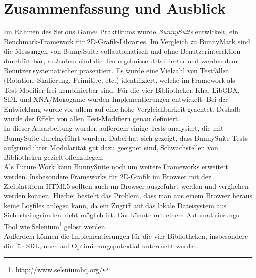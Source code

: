 \chapter{Zusammenfassung und Ausblick}
Im Rahmen des Serious Games Praktikums wurde \textit{BunnySuite} entwickelt, ein Benchmark-Framework für 2D-Grafik-Libraries. Im Vergleich zu BunnyMark sind die Messungen von BunnySuite vollautomatisch und ohne Benutzerinteraktion durchführbar, außerdem sind die Testergebnisse detaillierter und werden dem Benutzer systematischer präsentiert. Es wurde eine Vielzahl von Testfällen (Rotation, Skalierung, Primitive, etc.) identifiziert, welche im Framework als Test-Modifier frei kombinierbar sind. Für die vier Bibliotheken Kha, LibGDX, SDL und XNA/Monogame wurden Implementierungen entwickelt. Bei der Entwicklung wurde vor allem auf eine hohe Vergleichbarkeit geachtet. Deshalb wurde der Effekt von allen Test-Modifiern genau definiert.\\
In dieser Ausarbeitung wurden außerdem einige Tests analysiert, die mit BunnySuite durchgeführt wurden. Dabei hat sich gezeigt, dass BunnySuite-Tests aufgrund ihrer Modularität gut dazu geeignet sind, Schwachstellen von Bibliotheken gezielt offenzulegen. 
\\
Als Future Work kann BunnySuite noch um weitere Frameworks erweitert werden. Insbesondere Frameworks für 2D-Grafik im Browser mit der Zielplattform HTML5 sollten auch im Browser ausgeführt werden und verglichen werden können. Hierbei besteht das Problem, dass man aus einem Browser heraus keine Logfiles anlegen kann, da ein Zugriff auf das lokale Dateisystem aus Sicherheitsgründen nicht möglich ist. Das könnte mit einem Automatisierungs-Tool wie Selenium\footnote{\url{http://www.seleniumhq.org/}} gelöst werden.\\
Außerdem können die Implementierungen für die vier Bibliotheken, insbesondere die für SDL, noch auf Optimierungspotential untersucht werden.
